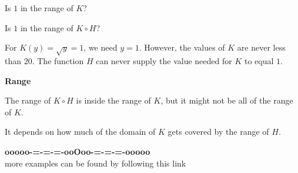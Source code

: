 \documentclass{ximera}
\begin{document}
\begin{question}



Is $1$ in the range of $K$?

\begin{multipleChoice}
\end{multipleChoice}





Is $1$ in the range of $K \circ H$?

\begin{multipleChoice}
\end{multipleChoice}


\end{question}


For $K(y) = \sqrt{y} = 1$, we need $y=1$.  However, the values of $K$ are never less than $20$.  The function $H$ can never supply the value needed for $K$ to equal $1$.






\begin{warning} \textbf{\textcolor{red!70!black}{Range}}


The range of $K \circ H$ is inside the range of $K$, but it might not be all of the range of $K$. 


It depends on how much of the domain of $K$ gets covered by the range of $H$.


\end{warning}
























\begin{center}
\textbf{\textcolor{green!50!black}{ooooo-=-=-=-ooOoo-=-=-=-ooooo}} \\

more examples can be found by following this link\\ 

\end{center}
\end{document}
